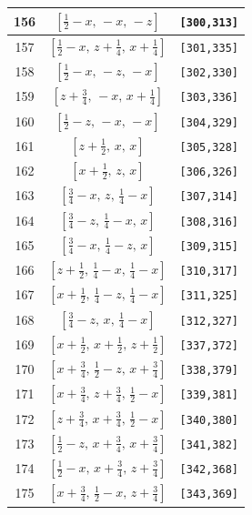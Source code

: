 \documentclass[fleqn,8pt]{jsarticle}
\begin{document}
\begin{longtable}{ccc}
156 & $\left[ \frac{1}{2} - x,\, - x,\, - z \right]$ & {\tt [300,313]} \\ \hline
157 & $\left[ \frac{1}{2} - x,\, z + \frac{1}{4},\, x + \frac{1}{4} \right]$ & {\tt [301,335]} \\ \hline
158 & $\left[ \frac{1}{2} - x,\, - z,\, - x \right]$ & {\tt [302,330]} \\ \hline
159 & $\left[ z + \frac{3}{4},\, - x,\, x + \frac{1}{4} \right]$ & {\tt [303,336]} \\ \hline
160 & $\left[ \frac{1}{2} - z,\, - x,\, - x \right]$ & {\tt [304,329]} \\ \hline
161 & $\left[ z + \frac{1}{2},\, x,\, x \right]$ & {\tt [305,328]} \\ \hline
162 & $\left[ x + \frac{1}{2},\, z,\, x \right]$ & {\tt [306,326]} \\ \hline
163 & $\left[ \frac{3}{4} - x,\, z,\, \frac{1}{4} - x \right]$ & {\tt [307,314]} \\ \hline
164 & $\left[ \frac{3}{4} - z,\, \frac{1}{4} - x,\, x \right]$ & {\tt [308,316]} \\ \hline
165 & $\left[ \frac{3}{4} - x,\, \frac{1}{4} - z,\, x \right]$ & {\tt [309,315]} \\ \hline
166 & $\left[ z + \frac{1}{2},\, \frac{1}{4} - x,\, \frac{1}{4} - x \right]$ & {\tt [310,317]} \\ \hline
167 & $\left[ x + \frac{1}{2},\, \frac{1}{4} - z,\, \frac{1}{4} - x \right]$ & {\tt [311,325]} \\ \hline
168 & $\left[ \frac{3}{4} - z,\, x,\, \frac{1}{4} - x \right]$ & {\tt [312,327]} \\ \hline
169 & $\left[ x + \frac{1}{2},\, x + \frac{1}{2},\, z + \frac{1}{2} \right]$ & {\tt [337,372]} \\ \hline
170 & $\left[ x + \frac{3}{4},\, \frac{1}{2} - z,\, x + \frac{3}{4} \right]$ & {\tt [338,379]} \\ \hline
171 & $\left[ x + \frac{3}{4},\, z + \frac{3}{4},\, \frac{1}{2} - x \right]$ & {\tt [339,381]} \\ \hline
172 & $\left[ z + \frac{3}{4},\, x + \frac{3}{4},\, \frac{1}{2} - x \right]$ & {\tt [340,380]} \\ \hline
173 & $\left[ \frac{1}{2} - z,\, x + \frac{3}{4},\, x + \frac{3}{4} \right]$ & {\tt [341,382]} \\ \hline
174 & $\left[ \frac{1}{2} - x,\, x + \frac{3}{4},\, z + \frac{3}{4} \right]$ & {\tt [342,368]} \\ \hline
175 & $\left[ x + \frac{3}{4},\, \frac{1}{2} - x,\, z + \frac{3}{4} \right]$ & {\tt [343,369]} \\ \hline

\end{longtable}
\end{document}
